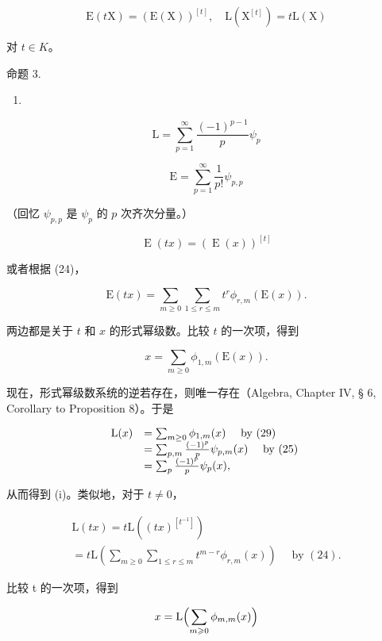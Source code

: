 \[
\mathrm{E} (t \mathrm{X}) = (\mathrm{E} (\mathrm{X})) ^ {[ t ]}, \quad \mathrm{L} (\mathrm{X} ^ {[ t ]}) = t \mathrm{L} (\mathrm{X})
\]

对 \(t \in K\)。

命题 3.

\begin{enumerate}
\def\labelenumi{(\arabic{enumi})}
\setcounter{enumi}{26}
\tightlist
\item
\end{enumerate}

\[
\mathrm{L} = \sum_ {p = 1} ^ {\infty} \frac {(- 1) ^ {p - 1}}{p} \psi_ {p}\tag{27}
\]

\[
\mathrm{E} = \sum_ {p = 1} ^ {\infty} \frac {1}{p !} \psi_ {p, p}\tag{28}
\]

（回忆 \(\psi_{p,p}\) 是 \(\psi_{p}\) 的 \(p\) 次齐次分量。）

\[
\operatorname{E} (t x) = (\operatorname{E} (x)) ^ {[ t ]}
\]

或者根据 (24)，

\[
\mathrm{E} (t x) = \sum_ {m \geqslant 0} \sum_ {1 \leqslant r \leqslant m} t ^ {r} \phi_ {r, m} (\mathrm{E} (x)).
\]

两边都是关于 \(t\) 和 \(x\) 的形式幂级数。比较 \(t\) 的一次项，得到

\[
x = \sum_ {m \geqslant 0} \phi_ {1, m} (\mathrm{E} (x)).\tag{29}
\]

现在，形式幂级数系统的逆若存在，则唯一存在（Algebra, Chapter IV, § 6, Corollary to Proposition 8）。于是

\[
\begin{array}{r l} \mathrm{L} (x) & = \sum_ {m \geq 0} \phi_ {1, m} (x) \quad \text { by   (29) } \\ & = \sum_ {p, m} \frac {(- 1) ^ {p}}{p} \psi_ {p, m} (x) \quad \text { by   (25) } \\ & = \sum_ {p} \frac {(- 1) ^ {p}}{p} \psi_ {p} (x), \end{array}
\]

从而得到 (i)。类似地，对于 \(t \neq 0\)，

\[
\begin{array}{l} \mathrm{L} (t x) = t \mathrm{L} ((t x) ^ {[ t ^ {- 1} ]}) \\ = t \mathrm{L} \left(\sum_ {m \geqslant 0} \sum_ {1 \leqslant r \leqslant m} t ^ {m - r} \phi_ {r, m} (x)\right) \quad \text { by } (24). \end{array}
\]

比较 t 的一次项，得到

\[
x = \mathrm{L} \Bigl (\sum_ {m \geqslant 0} \phi_ {m, m} (x) \Bigr)
\]

